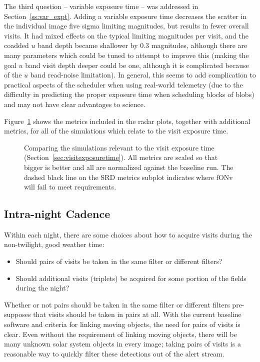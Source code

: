 The third question -- variable exposure time -- was addressed in Section~\ref{ss:var_expt}. Adding a variable exposure time decreases the scatter in the individual image five sigma limiting magnitudes, but results in fewer overall visits. It had mixed effects on the typical limiting magnitudes per visit, and the coadded $u$ band depth became shallower by 0.3 magnitudes, although there are many parameters which could be tuned to attempt to improve this (making the goal $u$ band visit depth deeper could be one, although it is complicated because of the $u$ band read-noise limitation). In general, this seems to add complication to practical aspects of the scheduler when using real-world telemetry (due to the difficulty in predicting the proper exposure time when scheduling blocks of blobs) and may not have clear advantages to science.

Figure~\ref{fig:visit_exp_time_metrics} shows the metrics included in the radar plots, together with additional metrics, for all of the simulations which relate to the visit exposure time. 

\begin{figure}
\caption{Comparing the simulations relevant to the visit exposure time (Section~\ref{sec:visitexposuretime}). All metrics are scaled so that bigger is better and all are normalized against the baseline run. The dashed black line on the SRD metrics subplot indicates where fONv will fail to meet requirements.}
\label{fig:visit_exp_time_metrics}
\end{figure}

\subsection{Intra-night Cadence}\label{sec:intranight}

Within each night, there are some choices about how to acquire visits during the non-twilight, good weather time:
\begin{itemize}
\item Should pairs of visits be taken in the same filter or different filters?
\item Should additional visits (triplets) be acquired for some portion of the fields during the night?
\end{itemize}

Whether or not pairs should be taken in the same filter or different filters pre-supposes that visits should be taken in pairs at all. With the current baseline software and criteria for linking moving objects, the need for pairs of visits is clear. Even without the requirement of linking moving objects, there will be many unknown solar system objects in every image; taking pairs of visits is a reasonable way to quickly filter these detections out of the alert stream. 

